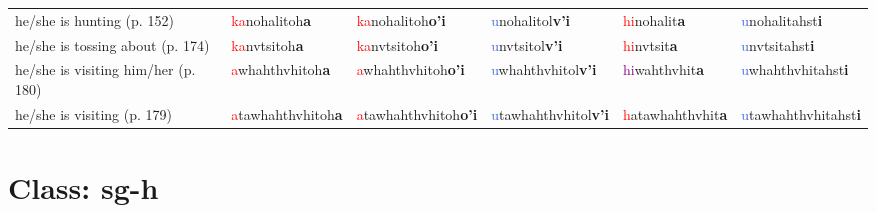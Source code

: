 \documentclass[oneside,openany]{book}%
\begin{document}
\begin{tabularx}{\textwidth}{>{\hsize=1.5\hsize\RaggedRight}X >{\hsize=0.9\hsize}X >{\hsize=0.9\hsize}X >{\hsize=0.9\hsize}X >{\hsize=0.9\hsize}X >{\hsize=0.9\hsize}X}
he/she is hunting (p. 152)&\textcolor{Red}{ka}nohalitoh\textbf{a}&\textcolor{Red}{ka}nohalitoh\textbf{o'i}&\textcolor{RoyalBlue}{u}nohalitol\textbf{v'i}&\textcolor{Red}{hi}nohalit\textbf{a}&\textcolor{RoyalBlue}{u}nohalitahst\textbf{i}\\%
he/she is tossing about (p. 174)&\textcolor{Red}{ka}nvtsitoh\textbf{a}&\textcolor{Red}{ka}nvtsitoh\textbf{o'i}&\textcolor{RoyalBlue}{u}nvtsitol\textbf{v'i}&\textcolor{Red}{hi}nvtsit\textbf{a}&\textcolor{RoyalBlue}{u}nvtsitahst\textbf{i}\\%
he/she is visiting him/her (p. 180)&\textcolor{Red}{a}whahthvhitoh\textbf{a}&\textcolor{Red}{a}whahthvhitoh\textbf{o'i}&\textcolor{RoyalBlue}{u}whahthvhitol\textbf{v'i}&\textcolor{Purple}{hi}wahthvhit\textbf{a}&\textcolor{RoyalBlue}{u}whahthvhitahst\textbf{i}\\%
he/she is visiting (p. 179)&\textcolor{Red}{a}tawhahthvhitoh\textbf{a}&\textcolor{Red}{a}tawhahthvhitoh\textbf{o'i}&\textcolor{RoyalBlue}{u}tawhahthvhitol\textbf{v'i}&\textcolor{Red}{h}atawhahthvhit\textbf{a}&\textcolor{RoyalBlue}{u}tawhahthvhitahst\textbf{i}\\%
\bottomrule%
\end{tabularx}%
\vspace{1em}%
\needspace{3in}%
\section*{Class: sg-h}%
%
\needspace{1in}%
\end{document}
